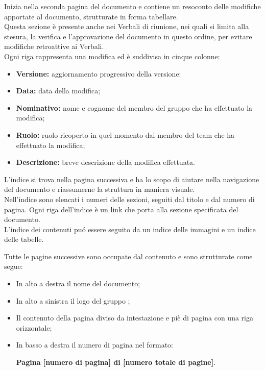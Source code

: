         Inizia nella seconda pagina del documento e contiene un resoconto delle modifiche apportate al documento, strutturate in forma tabellare.\\
        Questa sezione è presente anche nei Verbali di riunione, nei quali si limita alla stesura, la verifica e l'approvazione del documento in questo ordine, per evitare modifiche retroattive ai Verbali.\\
        Ogni riga rappresenta una modifica ed è suddivisa in cinque colonne:
        \begin{itemize}
          \item \textbf{Versione:} aggiornamento progressivo della versione:
          \item \textbf{Data:} data della modifica;
          \item \textbf{Nominativo:} nome e cognome del membro del gruppo che ha effettuato la modifica;
          \item \textbf{Ruolo:} ruolo ricoperto in quel momento dal membro del team che ha effettuato la modifica;
          \item \textbf{Descrizione:} breve descrizione della modifica effettuata.
        \end{itemize}

        L'indice si trova nella pagina successiva e ha lo scopo di aiutare nella navigazione del documento e riassumerne la struttura in maniera visuale.\\
        Nell'indice sono elencati i numeri delle sezioni, seguiti dal titolo e dal numero di pagina. Ogni riga dell'indice è un link che porta alla sezione specificata del documento.\\
        L'indice dei contenuti puó essere seguito da un indice delle immagini e un indice delle tabelle.

        Tutte le pagine successive sono occupate dal contenuto e sono strutturate come segue:
        \begin{itemize}
          \item In alto a destra il nome del documento;
          \item In alto a sinistra il logo del gruppo \Gruppo{};
          \item Il contenuto della pagina diviso da intestazione e piè di pagina con una riga orizzontale;
          \item In basso a destra il numero di pagina nel formato:
          \begin{center}
            \textbf{Pagina [numero di pagina] di [numero totale di pagine]}.
          \end{center}
        \end{itemize}

